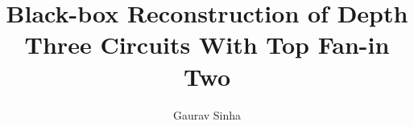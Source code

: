 \documentclass[12pt]{caltech_thesis}
\theoremstyle{plain}
\theoremstyle{definition}
\begin{document}
\title{Black-box Reconstruction of Depth Three Circuits With Top Fan-in Two}
\author{Gaurav Sinha}

\address{Pasadena, California}                     %



\maketitle[logo]
\end{document}
